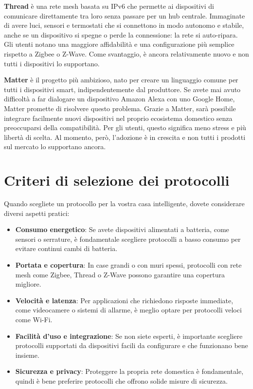 \textbf{Thread} è una rete mesh basata su IPv6 che permette ai dispositivi di comunicare direttamente tra loro senza passare per un hub centrale. Immaginate di avere luci, sensori e termostati che si connettono in modo autonomo e stabile, anche se un dispositivo si spegne o perde la connessione: la rete si auto-ripara. Gli utenti notano una maggiore affidabilità e una configurazione più semplice rispetto a Zigbee o Z-Wave. Come svantaggio, è ancora relativamente nuovo e non tutti i dispositivi lo supportano.

\textbf{Matter} è il progetto più ambizioso, nato per creare un linguaggio comune per tutti i dispositivi smart, indipendentemente dal produttore. Se avete mai avuto difficoltà a far dialogare un dispositivo Amazon Alexa con uno Google Home, Matter promette di risolvere questo problema. Grazie a Matter, sarà possibile integrare facilmente nuovi dispositivi nel proprio ecosistema domestico senza preoccuparsi della compatibilità. Per gli utenti, questo significa meno stress e più libertà di scelta. Al momento, però, l’adozione è in crescita e non tutti i prodotti sul mercato lo supportano ancora.

\section{Criteri di selezione dei protocolli}
Quando scegliete un protocollo per la vostra casa intelligente, dovete considerare diversi aspetti pratici:
\begin{itemize}
    \item \textbf{Consumo energetico}: Se avete dispositivi alimentati a batteria, come sensori o serrature, è fondamentale scegliere protocolli a basso consumo per evitare continui cambi di batteria.
    \item \textbf{Portata e copertura}: In case grandi o con muri spessi, protocolli con rete mesh come Zigbee, Thread o Z-Wave possono garantire una copertura migliore.
    \item \textbf{Velocità e latenza}: Per applicazioni che richiedono risposte immediate, come videocamere o sistemi di allarme, è meglio optare per protocolli veloci come Wi-Fi.
    \item \textbf{Facilità d'uso e integrazione}: Se non siete esperti, è importante scegliere protocolli supportati da dispositivi facili da configurare e che funzionano bene insieme.
    \item \textbf{Sicurezza e privacy}: Proteggere la propria rete domestica è fondamentale, quindi è bene preferire protocolli che offrono solide misure di sicurezza.
\end{itemize}

